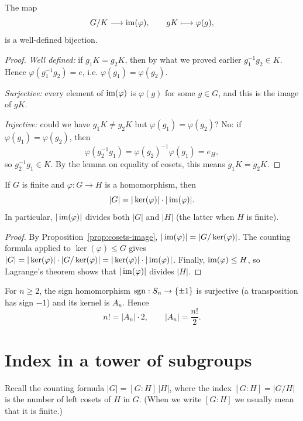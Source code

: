 \documentclass[reqno,11pt]{amsart}
\begin{document}
\begin{proposition}\label{prop:cosets-image}
The map
\[
  G/K\longrightarrow\operatorname{im}(\varphi),\qquad gK\longmapsto\varphi(g),
\]
is a well-defined bijection.
\end{proposition}
\begin{proof}
\emph{Well defined:} if $g_1K=g_2K$, then by what we proved earlier $g_1^{-1}g_2 \in K.$ Hence $\varphi(g_1^{-1}g_2)=e$, i.e. $\varphi(g_1)=\varphi(g_2)$.

\emph{Surjective:} every element of $\operatorname{im}(\varphi)$ is $\varphi(g)$ for
some $g\in G$, and this is the image of $gK$.

\emph{Injective:} could we have $g_1K\neq g_2K$ but
$\varphi(g_1)=\varphi(g_2)$? No: if $\varphi(g_1)=\varphi(g_2)$, then
\[
  \varphi(g_2^{-1}g_1)=\varphi(g_2)^{-1}\varphi(g_1)=e_H,
\]
so $g_2^{-1}g_1\in K$. By the lemma on equality of cosets, this means
$g_1K=g_2K$.
\end{proof}

\begin{theorem}\label{thm:hom-count}
If $G$ is finite and $\varphi:G\to H$ is a homomorphism, then
\begin{equation}
  |G|=|\ker(\varphi)|\cdot|\operatorname{im}(\varphi)|.
\end{equation}
In particular, $|\operatorname{im}(\varphi)|$ divides both $|G|$ and $|H|$ (the latter
when $H$ is finite).
\end{theorem}
\begin{proof}
By Proposition~\ref{prop:cosets-image}, $|\operatorname{im}(\varphi)|=|G/\ker(\varphi)|$.
The counting formula applied to $\ker(\varphi)\leq G$ gives
$|G|=|\ker(\varphi)|\cdot|G/\ker(\varphi)|=|\ker(\varphi)|\cdot|\operatorname{im}(\varphi)|$.
Finally, $\operatorname{im}(\varphi)\leq H$, so Lagrange's theorem shows that
$|\operatorname{im}(\varphi)|$ divides $|H|$.
\end{proof}

\begin{example}
For $n\geq2$, the sign homomorphism $\operatorname{sgn}:S_n\to\{\pm1\}$ is surjective
(a transposition has sign $-1$) and its kernel is $A_n$. Hence
\[
  n!=|A_n|\cdot2,\qquad |A_n|=\frac{n!}{2}.
\]
\end{example}

\section{Index in a tower of subgroups}

Recall the counting formula $|G|=[G:H]\,|H|$, where the index
$[G:H]=|G/H|$ is the number of left cosets of $H$ in $G$. (When we write
$[G:H]$ we usually mean that it is finite.)
\end{document}
